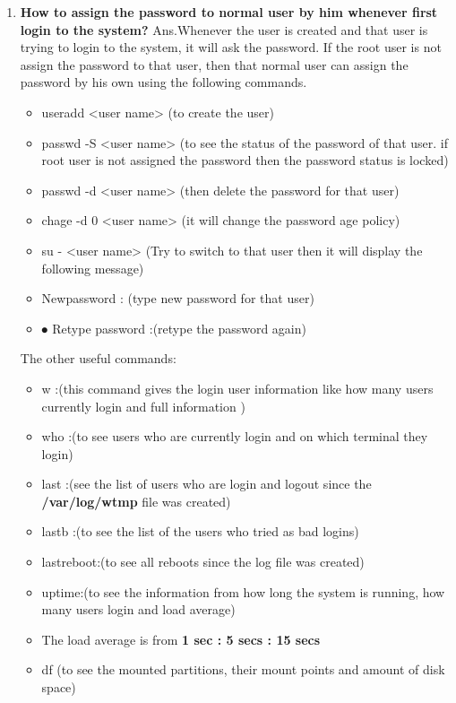 \begin{enumerate}
    \item\textbf{How to assign the password to normal user by him whenever first login to the system?}
    \newline
    Ans.Whenever the user is created and that user is trying to login to the system, it will ask the password. If the root user is not assign the password to that user, then that normal user can assign the password by his own using the following commands.
    \begin{itemize}
        \item useradd    <user name>		(to create the user)
        \item passwd  -S  <user name> (to see the status of the password of that user. if root user is not   assigned the password then the password status is  locked)
        \item passwd  -d    <user name>	(then delete the password for that user)
        \item chage    -d   0   <user name>	(it will change the password age policy)
        \item su   -   <user name>		(Try to switch to that user then it will display the following message)
        \item Newpassword :	(type new password for that user)
        \item ⦁	Retype password :(retype the password again)
    \end{itemize}
    \newline
    The other useful commands:
    \begin{itemize}
        \item w :(this command gives the login user information like how many users currently login and full information )
        \item who :(to see users who are currently login and on which terminal they login)
        \item last :(see the list of users who are login and logout since the   \textbf{/var/log/wtmp } file was created)
        \item lastb	:(to see the list of the users who tried as bad logins)
        \item lastreboot:(to see all reboots since the log file was created)
        \item uptime:(to see the information from how long the system is running, how many users login and load   average)
        \item The load average is  from \textbf{1 sec	 :   5 secs   :   15 secs}
        \item df (to see the mounted partitions, their mount points and amount of disk space)

\end{itemize}
\end{enumerate}
